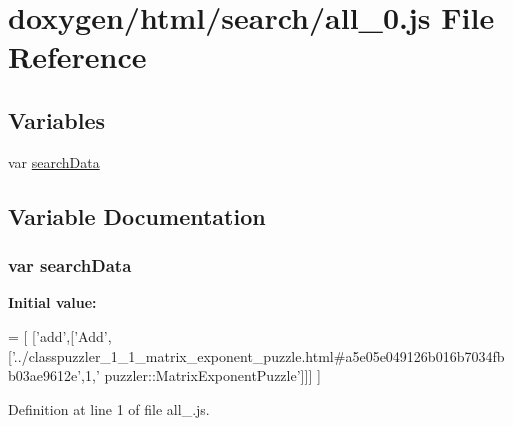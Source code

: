 \hypertarget{a00040}{}\section{doxygen/html/search/all\+\_\+0.js File Reference}
\label{a00040}
\subsection*{Variables}
\begin{DoxyCompactItemize}
\item 
var \hyperlink{a00040_ad01a7523f103d6242ef9b0451861231e}{search\+Data}
\end{DoxyCompactItemize}


\subsection{Variable Documentation}
\hypertarget{a00040_ad01a7523f103d6242ef9b0451861231e}{}
\subsubsection[{search\+Data}]{\setlength{\rightskip}{0pt plus 5cm}var search\+Data}\label{a00040_ad01a7523f103d6242ef9b0451861231e}
{\bfseries Initial value\+:}
\begin{DoxyCode}
=
[
  [\textcolor{stringliteral}{'add'},[\textcolor{stringliteral}{'Add'},[\textcolor{stringliteral}{'../classpuzzler\_1\_1\_matrix\_exponent\_puzzle.html#a5e05e049126b016b7034fbb03ae9612e'},1,\textcolor{stringliteral}{'
      puzzler::MatrixExponentPuzzle'}]]]
]
\end{DoxyCode}


Definition at line 1 of file all\+\_.\+js.

